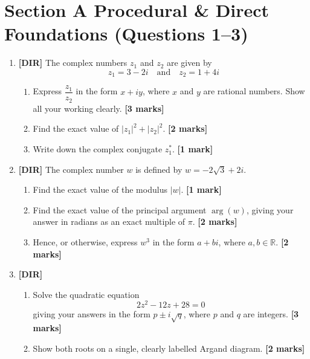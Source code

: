 \documentclass[11pt,a4paper]{article}
\begin{document}
\thispagestyle{plain}


\section*{Section A \quad Procedural \& Direct Foundations \hfill{\normalfont\footnotesize(Questions 1--3)}}
\begin{enumerate}

\item \textbf{[DIR]} The complex numbers $z_1$ and $z_2$ are given by
\[
z_1 = 3 - 2i \quad \text{and} \quad z_2 = 1 + 4i
\]
\begin{enumerate}[label=(\alph*)]
  \item Express $\dfrac{z_1}{z_2}$ in the form $x + iy$, where $x$ and $y$ are rational numbers. Show all your working clearly. \hfill{\textbf{[3 marks]}}
  \item Find the exact value of $|z_1|^2 + |z_2|^2$. \hfill{\textbf{[2 marks]}}
  \item Write down the complex conjugate $z_1^*$. \hfill{\textbf{[1 mark]}}
\end{enumerate}

\item \textbf{[DIR]} The complex number $w$ is defined by $w = -2\sqrt{3} + 2i$.
\begin{enumerate}[label=(\alph*)]
  \item Find the exact value of the modulus $|w|$. \hfill{\textbf{[1 mark]}}
  \item Find the exact value of the principal argument $\arg(w)$, giving your answer in radians as an exact multiple of $\pi$. \hfill{\textbf{[2 marks]}}
  \item Hence, or otherwise, express $w^3$ in the form $a + bi$, where $a, b \in \mathbb{R}$. \hfill{\textbf{[2 marks]}}
\end{enumerate}

\item \textbf{[DIR]} 
\begin{enumerate}[label=(\alph*)]
  \item Solve the quadratic equation
  \[
  2z^2 - 12z + 28 = 0
  \]
  giving your answers in the form $p \pm i\sqrt{q}$, where $p$ and $q$ are integers. \hfill{\textbf{[3 marks]}}
  \item Show both roots on a single, clearly labelled Argand diagram. \hfill{\textbf{[2 marks]}}
\end{enumerate}

\end{enumerate}
\end{document}
